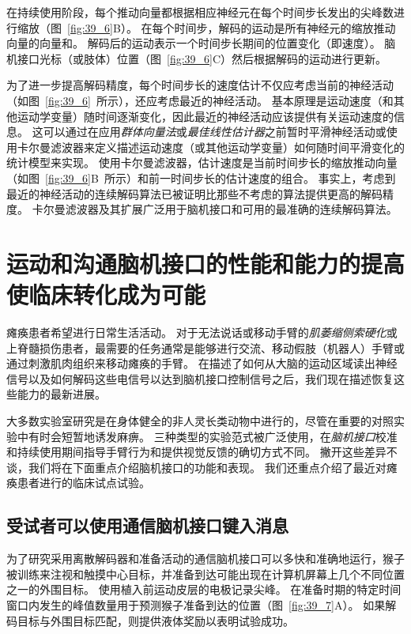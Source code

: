 在持续使用阶段，每个推动向量都根据相应神经元在每个时间步长发出的尖峰数进行缩放（图~\ref{fig:39_6}B）。
在每个时间步，解码的运动是所有神经元的缩放推动向量的向量和。
解码后的运动表示一个时间步长期间的位置变化（即速度）。
脑机接口光标（或肢体）位置（图~\ref{fig:39_6}C）然后根据解码的运动进行更新。


为了进一步提高解码精度，每个时间步长的速度估计不仅应考虑当前的神经活动（如图~\ref{fig:39_6}~所示），还应考虑最近的神经活动。
基本原理是运动速度（和其他运动学变量）随时间逐渐变化，因此最近的神经活动应该提供有关运动速度的信息。 
这可以通过在应用\textit{群体向量法}或\textit{最佳线性估计器}之前暂时平滑神经活动或使用卡尔曼滤波器来定义描述运动速度（或其他运动学变量）如何随时间平滑变化的统计模型来实现。
使用卡尔曼滤波器，估计速度是当前时间步长的缩放推动向量（如图~\ref{fig:39_6}B~所示）和前一时间步长的估计速度的组合。
事实上，考虑到最近的神经活动的连续解码算法已被证明比那些不考虑的算法提供更高的解码精度。
卡尔曼滤波器及其扩展广泛用于脑机接口和可用的最准确的连续解码算法。



\section{运动和沟通脑机接口的性能和能力的提高使临床转化成为可能}

瘫痪患者希望进行日常生活活动。
对于无法说话或移动手臂的\textit{肌萎缩侧索硬化}或上脊髓损伤患者，最需要的任务通常是能够进行交流、移动假肢（机器人）手臂或通过刺激肌肉组织来移动瘫痪的手臂。
在描述了如何从大脑的运动区域读出神经信号以及如何解码这些电信号以达到脑机接口控制信号之后，我们现在描述恢复这些能力的最新进展。


大多数实验室研究是在身体健全的非人灵长类动物中进行的，尽管在重要的对照实验中有时会短暂地诱发麻痹。
三种类型的实验范式被广泛使用，在\textit{脑机接口}校准和持续使用期间指导手臂行为和提供视觉反馈的确切方式不同。
撇开这些差异不谈，我们将在下面重点介绍脑机接口的功能和表现。
我们还重点介绍了最近对瘫痪患者进行的临床试点试验。



\subsection{受试者可以使用通信脑机接口键入消息}

为了研究采用离散解码器和准备活动的通信脑机接口可以多快和准确地运行，猴子被训练来注视和触摸中心目标，并准备到达可能出现在计算机屏幕上几个不同位置之一的外围目标。
使用植入前运动皮层的电极记录尖峰。
在准备时期的特定时间窗口内发生的峰值数量用于预测猴子准备到达的位置（图~\ref{fig:39_7}A）。
如果解码目标与外围目标匹配，则提供液体奖励以表明试验成功。

